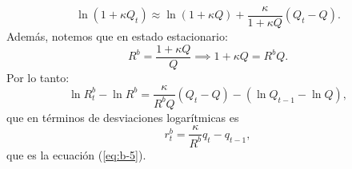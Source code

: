 \documentclass[../../entrega.tex]{subfiles}
\begin{document}
\begin{equation*}
    \ln(1 + \kappa Q_t) \approx \ln(1 + \kappa Q) + \frac{\kappa}{1 + \kappa Q}(Q_t - Q).
\end{equation*}
Además, notemos que en estado estacionario:
\begin{equation*}
    R^b = \frac{1 + \kappa Q}{Q} \implies 1 + \kappa Q = R^b Q.
\end{equation*}
Por lo tanto:
\begin{equation*}
    \ln R_t^b - \ln R^b = \frac{\kappa}{R^b Q}(Q_t - Q) - (\ln Q_{t-1} - \ln Q),
\end{equation*}
que en términos de desviaciones logarítmicas es
\begin{equation*}
    r_t^b = \frac{\kappa}{R^b}q_t - q_{t-1},
\end{equation*}
que es la ecuación (\ref{eq:b-5}).
\end{document}
